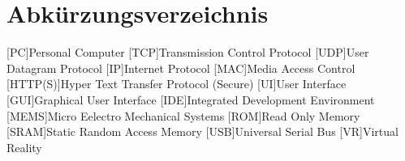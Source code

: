 \chapter*{Abkürzungsverzeichnis}
\begin{acronym}
    [PC]{Personal Computer}
    [TCP]{Transmission Control Protocol}
    [UDP]{User Datagram Protocol}
    [IP]{Internet Protocol}
    [MAC]{Media Access Control}
    [HTTP(S)]{Hyper Text Transfer Protocol (Secure)}
    [UI]{User Interface}
    [GUI]{Graphical User Interface}
    [IDE]{Integrated Development Environment}
    [MEMS]{Micro Eelectro Mechanical Systems}
    [ROM]{Read Only Memory}
    [SRAM]{Static Random Access Memory}
    [USB]{Universal Serial Bus}
    [VR]{Virtual Reality}
\end{acronym}